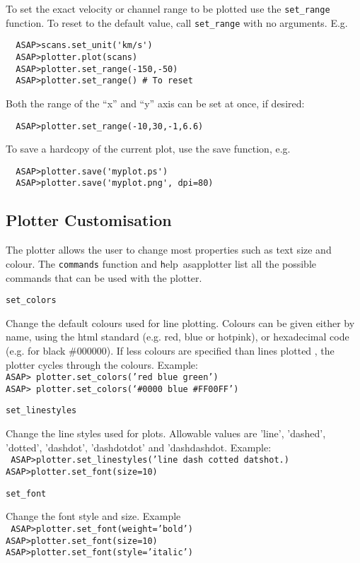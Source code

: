 \documentclass[11pt]{article}
\newcommand{\cmd}[1]{{\tt #1}}
\newcommand{\commanddef}[3]{
  \begin{minipage}[t]{27mm}\tt #1\end{minipage}\hspace{3mm}
  \begin{minipage}[t]{\textwidth-30mm}#2 \\ \tt #3\end{minipage}
}
\begin{document}
To set the exact velocity or channel range to be plotted use the
\cmd{set\_range} function. To reset to the default value, call
\cmd{set\_range} with no arguments. E.g.

\begin{verbatim}
  ASAP>scans.set_unit('km/s')
  ASAP>plotter.plot(scans)
  ASAP>plotter.set_range(-150,-50)
  ASAP>plotter.set_range() # To reset
\end{verbatim}

Both the range of the ``x'' and ``y'' axis can be set at once, if desired:

\begin{verbatim}
  ASAP>plotter.set_range(-10,30,-1,6.6)
\end{verbatim}

To save a hardcopy of the current plot, use the save function, e.g.

\begin{verbatim}
  ASAP>plotter.save('myplot.ps')
  ASAP>plotter.save('myplot.png', dpi=80)
\end{verbatim}

\subsection{Plotter Customisation}

The plotter allows the user to change most properties such as text
size and colour. The \cmd{commands} function and {\cmd help\
asapplotter} list all the possible commands that can be used with the
plotter.

\commanddef{set\_colors}{Change the default colours used for line
plotting. Colours can be given either by name, using the html standard
(e.g. red, blue or hotpink), or hexadecimal code (e.g. for black
\#000000). If less colours are specified than lines plotted , the
plotter cycles through the colours. Example:} {ASAP>
plotter.set\_colors('red blue green')\\ ASAP>
plotter.set\_colors(`\#0000 blue \#FF00FF')\\ }

\commanddef{set\_linestyles}{Change the line styles used for
plots. Allowable values are 'line', 'dashed', 'dotted', 'dashdot', 
'dashdotdot' and 'dashdashdot. Example: }{
  ASAP>plotter.set\_linestyles('line dash cotted datshot.)\\
  ASAP>plotter.set\_font(size=10)\\
}

\commanddef{set\_font}{Change the font style and size. Example}{
  ASAP>plotter.set\_font(weight='bold')\\
  ASAP>plotter.set\_font(size=10)\\
  ASAP>plotter.set\_font(style='italic')\\
}
\end{document}
